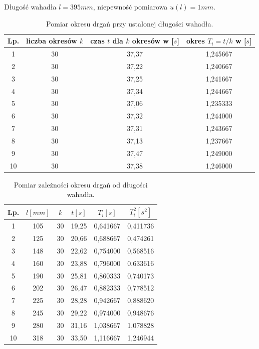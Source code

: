 \documentclass[a4paper,11pt]{article}
\begin{document}
\begin{table}[ht]
\centering
\caption{Pomiar okresu drgań przy ustalonej długości wahadła.}
Długość wahadła $l = 395 mm$, niepewność pomiarowa $u(l) = 1 mm$.
\begin{tabular}{|c|c|c|c|}
\hline
Lp. & liczba okresów $k$ & czas $t$ dla $k$ okresów w [$s$] & okres $T_{i}=t/k$ w [$s$] \\ \hline
1 & 30 & 37,37 & 1,245667\\ \hline
2 & 30 & 37,22 & 1,240667\\ \hline
3 & 30 & 37,25 & 1,241667\\ \hline
4 & 30 & 37,34 & 1,244667\\ \hline
5 & 30 & 37,06 & 1,235333\\ \hline
6 & 30 & 37,32 & 1,244000\\ \hline
7 & 30 & 37,31 & 1,243667\\ \hline
8 & 30 & 37,13 & 1,237667\\ \hline
9 & 30 & 37,47 & 1,249000\\ \hline
10 & 30 & 37,38 & 1,246000\\ \hline
\end{tabular}
\end{table}

\begin{table}[ht]
\centering
\caption{Pomiar zależności okresu drgań od długości wahadła.}
\begin{tabular}{|c|c|c|c|c|c|}
\hline
Lp. & $l[mm]$ & $k$ & $t[s]$ & $T_{i}[s]$ & $T_{i}^{2}[s^{2}]$ \\ \hline
1 & 105 & 30 & 19,25 & 0,641667 & 0,411736\\ \hline
2 & 125 & 30 & 20,66 & 0,688667 & 0,474261\\ \hline
3 & 148 & 30 & 22,62 & 0,754000 & 0,568516\\ \hline
4 & 160 & 30 & 23,88 & 0,796000 & 0.633616\\ \hline
5 & 190 & 30 & 25,81 & 0,860333 & 0,740173\\ \hline
6 & 202 & 30 & 26,47 & 0,882333 & 0,778512\\ \hline
7 & 225 & 30 & 28,28 & 0,942667 & 0,888620\\ \hline
8 & 245 & 30 & 29,22 & 0,974000 & 0,948676\\ \hline
9 & 280 & 30 & 31,16 & 1,038667 & 1,078828\\ \hline
10 & 318 & 30 & 33,50 & 1,116667 & 1,246944\\ \hline
\end{tabular}
\end{table}
\end{document}
